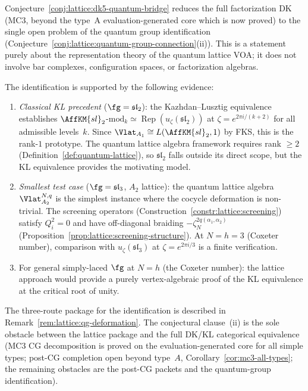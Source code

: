 \begin{remark}
\label{rem:lattice:qg-status}
Conjecture~\ref{conj:lattice:dk5-quantum-bridge} reduces the full
factorization DK (MC3, beyond the type~A evaluation-generated core which is now proved) to
the single open problem of the quantum group identification
(Conjecture~\ref{conj:lattice:quantum-group-connection}(ii)).
This is a statement purely about the representation theory of the
quantum lattice VOA; it does not involve bar complexes,
configuration spaces, or factorization algebras.

The identification is supported by the following evidence:
\begin{enumerate}[label=\textup{(\alph*)}]
\item \emph{Classical KL precedent}
 ($\fg = \mathfrak{sl}_2$):
 the Kazhdan--Lusztig equivalence \cite{KL93}
 establishes $\AffKM{sl}_2$-$\mathrm{mod}_k \simeq
 \operatorname{Rep}(u_\zeta(\mathfrak{sl}_2))$ at
 $\zeta = e^{2\pi i/(k+2)}$ for all admissible levels~$k$.
 Since $\Vlat_{A_1} \cong L(\AffKM{sl}_2, 1)$ by FKS, this
 is the rank-$1$ prototype. The quantum lattice algebra
 framework requires rank $\geq 2$
 (Definition~\ref{def:quantum-lattice}), so $\mathfrak{sl}_2$
 falls outside its direct scope, but the KL equivalence provides
 the motivating model.

\item \emph{Smallest test case}
 ($\fg = \mathfrak{sl}_3$, $A_2$ lattice):
 the quantum lattice algebra $\Vlat_{A_2}^{N,q}$ is the
 simplest instance where the cocycle deformation is non-trivial.
 The screening operators
 (Construction~\ref{constr:lattice:screening}) satisfy $Q_i^2 = 0$
 and have off-diagonal braiding
 $-\zeta_N^{2q(\alpha_1,\alpha_2)}$
 (Proposition~\ref{prop:lattice:screening-structure}).
 At $N = h = 3$ (Coxeter number), comparison with
 $u_\zeta(\mathfrak{sl}_3)$ at $\zeta = e^{2\pi i/3}$ is a
 finite verification.
\item For general simply-laced $\fg$ at $N = h$ (the Coxeter
 number): the lattice approach would provide a purely
 vertex-algebraic proof of the KL equivalence at the critical
 root of unity.
\end{enumerate}
The three-route package for the identification is described in
Remark~\ref{rem:lattice:qg-deformation}. The conjectural clause~(ii) is
the sole obstacle between the lattice package and the
full DK/KL categorical equivalence (MC3 CG decomposition is proved on the evaluation-generated core for all
simple types; post-CG completion open beyond type~$A$,
Corollary~\ref{cor:mc3-all-types}; the remaining obstacles
are the post-CG packets and the quantum-group identification).
\end{remark}

